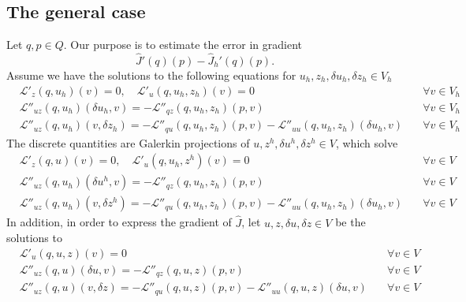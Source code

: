 \subsection{The general case}\label{subsec:}
%
Let $q,p\in Q$. Our purpose is to estimate the error in gradient
%
\begin{equation}\label{eq:ErrorInGrad}
 \hat J'(q)(p) - \hat J_h'(q)(p).
\end{equation}
%
%
Assume we have the solutions to the following equations for $u_h,z_h,\delta u_h, \delta z_h\in V_h$
%
\begin{subequations}\label{eq:GeneralDiscrete}
\begin{align}
\label{eq:GeneralDiscreteUZ}
&\mathcal L'_{z}(q,u_h)(v)= 0,\quad \mathcal L'_{u}(q,u_h,z_h)(v)= 0&\quad\forall v\in V_h\\
&\mathcal L''_{uz}(q,u_h)(\delta u_h, v)= -\mathcal L''_{qz}(q,u_h,z_h)(p, v)&\quad\forall v\in V_h\\
&\mathcal L''_{uz}(q,u_h)(v,\delta z_h)=-\mathcal L''_{qu}(q,u_h,z_h)(p, v)-\mathcal L''_{uu}(q,u_h,z_h)(\delta u_h, v)&\quad\forall v\in V_h
\end{align}
\end{subequations}
%
The discrete quantities are Galerkin projections of  $u,z^h,\delta u^h, \delta z^h\in V$, which solve
%
\begin{subequations}\label{eq:GeneralDiscreteContinuous}
\begin{align}
\label{eq:GeneralDiscreteContinuousUZ}
&\mathcal L'_{z}(q,u)(v)= 0,\quad \mathcal L'_{u}(q,u_h,z^h)(v)= 0&\quad\forall v\in V\\
\label{eq:GeneralDiscreteContinuousDU}
&\mathcal L''_{uz}(q,u_h)(\delta u^h, v)= -\mathcal L''_{qz}(q,u_h,z_h)(p, v)&\quad\forall v\in V\\
\label{eq:GeneralDiscreteContinuousDZ}
&\mathcal L''_{uz}(q,u_h)(v,\delta z^h)=-\mathcal L''_{qu}(q,u_h,z_h)(p, v)-\mathcal L''_{uu}(q,u_h,z_h)(\delta u_h, v)&\quad\forall v\in V
\end{align}
\end{subequations}
%
In addition, in order to express the gradient of $\hat J$, let $u,z,\delta u, \delta z\in V$ be the 
solutions to
%
\begin{subequations}\label{eq:GeneralContinuous}
\begin{align}
\label{eq:GeneralContinuousZ}
&\mathcal L'_{u}(q,u,z)(v)= 0&\quad\forall v\in V\\
\label{eq:GeneralContinuousDU}
&\mathcal L''_{uz}(q,u)(\delta u, v)= -\mathcal L''_{qz}(q,u,z)(p, v)&\quad\forall v\in V\\
\label{eq:GeneralContinuousDZ}
&\mathcal L''_{uz}(q,u)(v,\delta z)=-\mathcal L''_{qu}(q,u,z)(p, v)-\mathcal L''_{uu}(q,u,z)(\delta u, v)&\quad\forall v\in V
\end{align}
\end{subequations}
